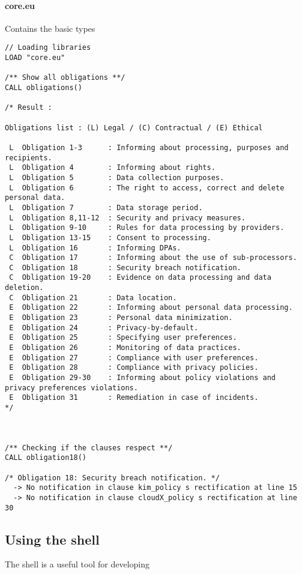 \paragraph{core.eu} Contains the basic types
\begin{lstlisting}
// Loading libraries
LOAD "core.eu"

/** Show all obligations **/
CALL obligations() 

/* Result :

Obligations list : (L) Legal / (C) Contractual / (E) Ethical 

 L  Obligation 1-3      : Informing about processing, purposes and recipients. 
 L  Obligation 4        : Informing about rights. 
 L  Obligation 5        : Data collection purposes. 
 L  Obligation 6        : The right to access, correct and delete personal data. 
 L  Obligation 7        : Data storage period. 
 L  Obligation 8,11-12  : Security and privacy measures. 
 L  Obligation 9-10     : Rules for data processing by providers. 
 L  Obligation 13-15    : Consent to processing. 
 L  Obligation 16       : Informing DPAs. 
 C  Obligation 17       : Informing about the use of sub-processors. 
 C  Obligation 18       : Security breach notification. 
 C  Obligation 19-20    : Evidence on data processing and data deletion. 
 C  Obligation 21       : Data location. 
 E  Obligation 22       : Informing about personal data processing. 
 E  Obligation 23       : Personal data minimization. 
 E  Obligation 24       : Privacy-by-default. 
 E  Obligation 25       : Specifying user preferences. 
 E  Obligation 26       : Monitoring of data practices. 
 E  Obligation 27       : Compliance with user preferences. 
 E  Obligation 28       : Compliance with privacy policies. 
 E  Obligation 29-30    : Informing about policy violations and privacy preferences violations. 
 E  Obligation 31       : Remediation in case of incidents. 
*/



/** Checking if the clauses respect **/
CALL obligation18()

/* Obligation 18: Security breach notification. */
  -> No notification in clause kim_policy s rectification at line 15
  -> No notification in clause cloudX_policy s rectification at line 30

\end{lstlisting}




\subsection{Using the shell}
The shell is a useful tool for developing 


